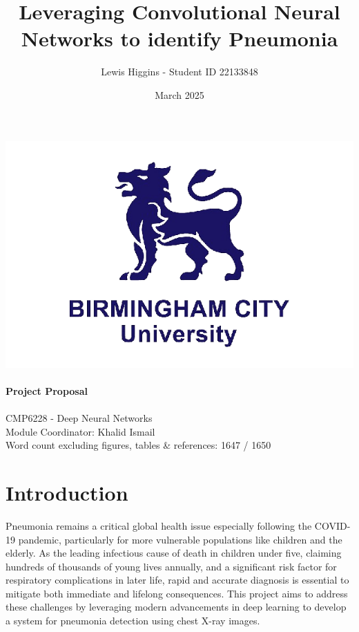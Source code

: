\documentclass[12pt]{report}
\title{Leveraging Convolutional Neural Networks to identify Pneumonia}
\author{Lewis Higgins - Student ID 22133848}
\date{March 2025}
\begin{document}
\makeatletter
\begin{titlepage}
    \begin{center}
        \includegraphics[width=0.7\linewidth]{BCU}\\[4ex]
        {\huge \bfseries \@title}\\[2ex]
        {\large \bfseries  Project Proposal}\\[50ex]
        {\@author}\\[2ex]
        {CMP6228 - Deep Neural Networks}\\[2ex]
        {Module Coordinator: Khalid Ismail}\\[2ex]
        {Word count excluding figures, tables \& references: 1647 / 1650}\\[10ex]
    \end{center}
\end{titlepage}
\makeatother
\thispagestyle{empty}
\newpage

\setcounter{page}{-2}

\tableofcontents
\thispagestyle{empty}

\listoffigures
\thispagestyle{empty}

\listoftables
\thispagestyle{empty}

\chapter*{Introduction}

Pneumonia remains a critical global health issue especially following the COVID-19 pandemic, particularly for more vulnerable populations like 
children and the elderly. As the leading infectious cause of death in children under five, claiming hundreds of thousands of young lives annually, 
and a significant risk factor for respiratory complications in later life, rapid and accurate diagnosis is essential to mitigate both immediate 
and lifelong consequences. This project aims to address these challenges by leveraging modern advancements in deep learning to develop a system 
for pneumonia detection using chest X-ray images.
\end{document}
